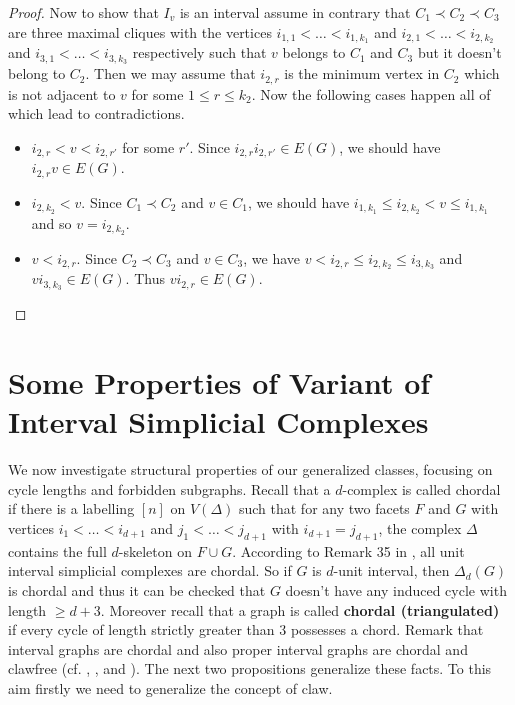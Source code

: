 \documentclass[12pt,reqno]{amsart}
\theoremstyle{plain}
\theoremstyle{definition}
\numberwithin{equation}{section}
\begin{document}
\begin{proof}
Now to show that $I_v$ is an interval assume in contrary that $C_1\prec C_2 \prec C_3$  are three maximal cliques with the vertices $i_{1,1}<\dots < i_{1,k_1}$ and $i_{2,1}<\dots < i_{2,k_2}$ and $i_{3,1}<\dots < i_{3,k_3}$ respectively such that $v$ belongs to $C_1$ and $C_3$ but it doesn't belong to $C_2$. Then we may assume that $i_{2,r}$ is the minimum vertex in $C_2$ which is not adjacent to $v$ for some $1\leq r \leq k_2$. Now the following cases happen all of which lead to contradictions.
\begin{itemize}
\item $i_{2,r}<v<i_{2,r'}$ for some $r'$. Since $i_{2,r}i_{2,r'}\in E(G)$, we should have $i_{2,r}v\in E(G)$.

\item $i_{2,k_2}<v$. Since $C_1\prec C_2$ and $v\in C_1$, we should have $i_{1,k_1}\leq i_{2,k_2}<v\leq i_{1,k_1}$ and so $v=i_{2,k_2}$.

\item $v<i_{2,r}$. Since $C_2\prec C_3$ and $v\in C_3$, we have $v<i_{2,r}\leq i_{2,k_2}\leq i_{3,k_3}$ and $vi_{3,k_3}\in E(G)$. Thus $vi_{2,r}\in E(G)$.
\end{itemize}
\hspace{1cm}
\end{proof}

\section{Some Properties of Variant of Interval Simplicial Complexes}
We now investigate structural properties of our generalized classes, focusing on cycle lengths and forbidden subgraphs.
Recall that a $d$-complex is called chordal if there is a labelling $[n]$ on $V(\Delta )$ such that for any two facets $F$ and $G$ with vertices $i_1< \dots < i_{d+1}$ and $j_1< \dots < j_{d+1}$ with $i_{d+1}=j_{d+1}$, the complex $\Delta$ contains the full $d$-skeleton on $F\cup G$. According to Remark 35 in \cite{B+S+V}, all unit interval simplicial complexes are chordal. So if $G$ is $d$-unit interval, then $\Delta_d(G)$ is chordal and thus it can be checked that $G$ doesn't have any induced cycle with length $\geq d+3$. Moreover recall that a graph is called \textbf{chordal (triangulated)}  if every cycle of length strictly greater than $3$ possesses a chord. Remark that interval graphs are chordal and also proper interval graphs are chordal and clawfree (cf. \cite{BW}, \cite{GH}, \cite{Herzog1} and \cite{R1}). The next two propositions generalize these facts. To this aim firstly we need to generalize the concept of claw.
\end{document}
